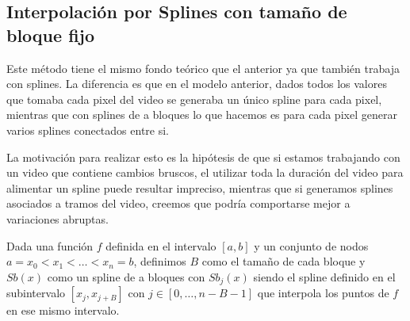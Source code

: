 \subsection{Interpolación por Splines con tamaño de bloque fijo}\label{MultiSplines}

Este método tiene el mismo fondo teórico que el anterior ya que también trabaja
con splines. La diferencia es que en el modelo anterior, dados todos los
valores que tomaba cada pixel del video se generaba un único spline para
cada pixel, mientras que con splines de a bloques lo que hacemos es para cada pixel
generar varios splines conectados entre si.

La motivación para realizar esto es la hipótesis de que si estamos trabajando
con un video que contiene cambios bruscos, el utilizar toda la duración del
video para alimentar un spline puede resultar impreciso, mientras que si
generamos splines asociados a tramos del video, creemos que podría comportarse
mejor a variaciones abruptas.

Dada una función $f$ definida en el intervalo $[a, b]$ y un conjunto de nodos $a
= x_0 < x_1 < \dots < x_n = b$, definimos $B$ como el tamaño de cada bloque y
$Sb(x)$ como un spline de a bloques con $Sb_j(x)$ siendo el spline definido en
el subintervalo $[x_j, x_{j+B}]$ con $j \in [0, \dots, n-B-1]$ que interpola los
puntos de $f$ en ese mismo intervalo.
